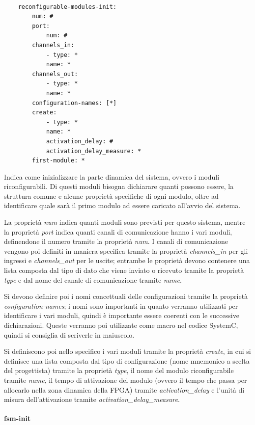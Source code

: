 \documentclass[a4paper,titlepage]{book}
\begin{document}
\begin{lstlisting}[frame=single]

	reconfigurable-modules-init:
		num: #
		port:
			num: #
		channels_in:
			- type: *
			name: *
		channels_out:
			- type: *
			name: *
		configuration-names: [*]
		create:
			- type: *
			name: *
			activation_delay: #
			activation_delay_measure: *
		first-module: *

\end{lstlisting}

Indica come inizializzare la parte dinamica del sistema, ovvero i moduli riconfigurabili. Di questi moduli bisogna dichiarare quanti possono essere, la struttura comune e alcune proprietà specifiche di ogni modulo, oltre ad identificare quale sarà il primo modulo ad essere caricato all'avvio del sistema.

La proprietà \textit{num} indica quanti moduli sono previsti per questo sistema, mentre la proprietà \textit{port} indica quanti canali di comunicazione hanno i vari moduli, definendone il numero tramite la proprietà \textit{num}. I canali di comunicazione vengono poi definiti in maniera specifica tramite la proprietà \textit{channels\_in} per gli ingressi e \textit{channels\_out} per le uscite; entrambe le proprietà devono contenere una lista composta dal tipo di dato che viene inviato o ricevuto tramite la proprietà \textit{type} e dal nome del canale di comunicazione tramite \textit{name}.

 Si devono definire poi i nomi concettuali delle configurazioni tramite la proprietà \textit{configuration-names}; i nomi sono importanti in quanto verranno utilizzati per identificare i vari moduli, quindi è importante essere coerenti con le successive dichiarazioni. Queste verranno poi utilizzate come macro nel codice SystemC, quindi si consiglia di scriverle in maiuscolo.
 
 Si definiscono poi nello specifico i vari moduli tramite la proprietà \textit{create}, in cui si definisce una lista composta dal tipo di configurazione (nome mnemonico a scelta del progettista) tramite la proprietà \textit{type}, il nome del modulo riconfigurabile tramite \textit{name}, il tempo di attivazione del modulo (ovvero il tempo che passa per allocarlo nella zona dinamica della FPGA) tramite \textit{activation\_delay} e l'unità di misura dell'attivazione tramite \textit{activation\_delay\_measure}.
  
\paragraph{fsm-init}
\end{document}
